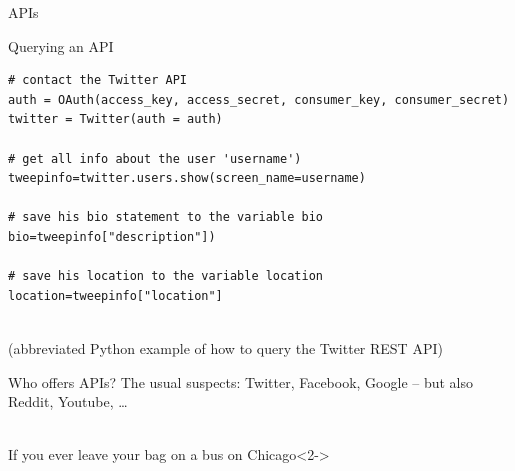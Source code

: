 \documentclass{beamer}
\begin{document}
\begin{frame}{APIs}
\end{frame}

\begin{frame}[fragile]{Querying an API}
\begin{lstlisting}
# contact the Twitter API
auth = OAuth(access_key, access_secret, consumer_key, consumer_secret)
twitter = Twitter(auth = auth)

# get all info about the user 'username')
tweepinfo=twitter.users.show(screen_name=username)

# save his bio statement to the variable bio
bio=tweepinfo["description"])

# save his location to the variable location
location=tweepinfo["location"]	
\end{lstlisting}
~\\ \tiny{(abbreviated Python example of how to query the Twitter REST API)}
\end{frame}


\begin{frame}{Who offers APIs?}
The usual suspects: Twitter, Facebook, Google -- but also Reddit, Youtube, \ldots \\~
\begin{block}{If you ever leave your bag on a bus on Chicago}<2->
\end{block}
\end{frame}
\end{document}
